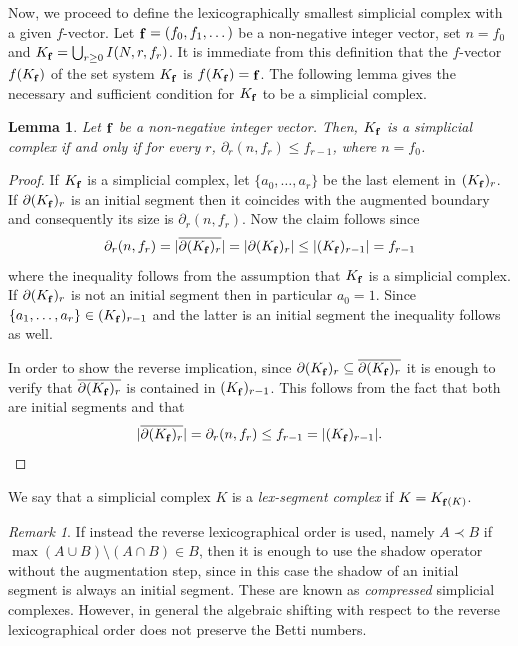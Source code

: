 \documentclass[reqno,english]{amsart}
\newtheorem{lemma}[theorem]{Lemma}
\numberwithin{claimcounter}{theorem}
\theoremstyle{remark}
\newtheorem{remark}[theorem]{Remark}
\theoremstyle{definition}
\numberwithin{theorem}{section}
\DeclareMathOperator{\fvec}{\bf f}
\begin{document}
Now, we proceed to define the lexicographically smallest simplicial complex with a given $f$-vector.
Let $\fvec = (f_0,f_1,\dots)$ be a non-negative integer vector, set $n=f_0$ and $K_{\fvec} = \bigcup_{r\geq 0}I(N,r,f_r)$.
It is immediate from this definition that the $f$-vector $f(K_{\fvec})$ of the set system $K_{\fvec}$ is $f(K_{\fvec}) = \fvec$.
The following lemma gives the necessary and sufficient condition for $K_{\fvec}$ to be a simplicial complex.
\begin{lemma}
    Let $\fvec$ be a non-negative integer vector. Then, $K_{\fvec}$ is a simplicial complex if and only if for every $r$, $\partial_r(n,f_r) \leq f_{r-1}$, where $n=f_0$.    
  \end{lemma}
\begin{proof}
  If $K_{\fvec}$ is a simplicial complex, let $\{a_0,\dots, a_r\}$ be the last element in  $(K_{\fvec})_r$.   
  If $\partial (K_{\fvec})_r$ is an initial segment then it coincides with the augmented boundary and consequently its size is $\partial_r(n,f_r)$.
  Now the claim follows since $$\partial_r(n,f_r) = |\overline{\partial (K_{\fvec})_r}| = |\partial (K_{\fvec})_r|\leq |(K_{\fvec})_{r-1}| = f_{r-1}$$
  where the inequality follows from the assumption that $K_{\fvec}$ is a simplicial complex.
  If $\partial (K_{\fvec})_r$ is not an initial segment then in particular $a_0=1$. Since $\{a_1,\dots,a_r\} \in (K_{\fvec})_{r-1}$ and the latter is an initial segment the inequality follows as well.

    In order to show the reverse implication, since $\partial (K_{\fvec})_r \subseteq \overline{\partial (K_{\fvec})_r}$ it is enough to verify that $\overline{\partial (K_{\fvec})_r}$ is contained in $(K_{\fvec})_{r-1}$. This follows from the fact that both are initial segments and that $$|\overline{\partial (K_{\fvec})_r}| = \partial_r (n,f_r) \leq f_{r-1} = |(K_{\fvec})_{r-1}|.$$
  \end{proof}
  
We say that a simplicial complex $K$ is a \emph{lex-segment complex} if $K = K_{\fvec(K)}$.

\begin{remark}
    If instead the reverse lexicographical order is used, namely $A\prec B$ if $\max (A\cup B)\setminus (A\cap B)\in B$, 
    then it 
    is enough to use the shadow operator without the augmentation step, since in this case the shadow of an initial segment is always an initial segment. 
    These are known as \emph{compressed} simplicial complexes.
    However, in general the algebraic shifting with respect to the reverse lexicographical order does not preserve the Betti numbers.
\end{remark}
\end{document}

